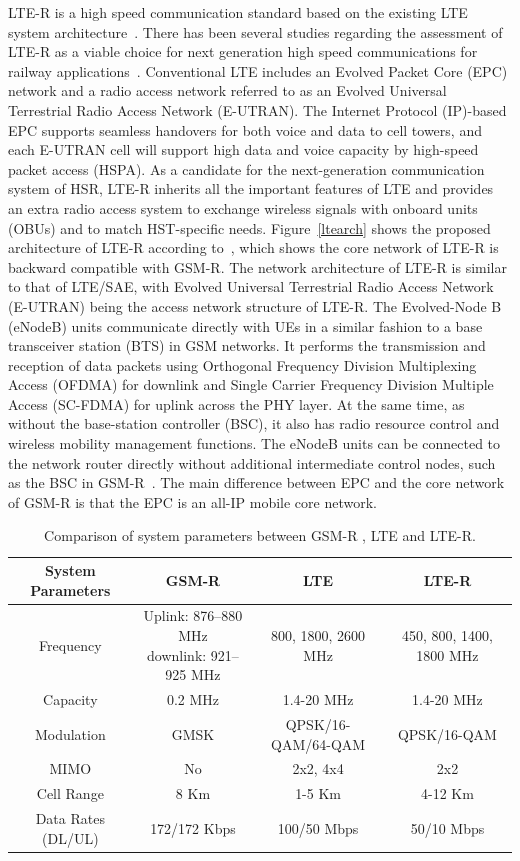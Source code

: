 LTE-R is a high speed communication standard based on the existing LTE system architecture~\cite{inplter4}. There has been several studies regarding the assessment of LTE-R as a viable choice for next generation high speed communications for railway applications~\cite{inplter5,inplter6}. Conventional LTE includes an Evolved Packet Core (EPC) network and a radio access network referred to as an Evolved Universal  Terrestrial  Radio  Access  Network (E-UTRAN). The  Internet  Protocol (IP)-based  EPC  supports  seamless handovers for both voice and data to cell towers, and each E-UTRAN cell will support high data and voice capacity by high-speed  packet  access  (HSPA).  As  a  candidate for the next-generation  communication  system  of  HSR,  LTE-R  inherits all the important features of LTE and provides an extra radio access system to exchange wireless signals with onboard  units (OBUs)  and to match HST-specific  needs. Figure~\ref{ltearch} shows the proposed architecture of LTE-R according to~\cite{trlter2}, which shows the core network of LTE-R is backward compatible with GSM-R. The network architecture of LTE-R is similar to that of LTE/SAE, with  Evolved Universal Terrestrial Radio Access Network (E-UTRAN) being the access network structure of LTE-R. The Evolved-Node B (eNodeB) units communicate directly with UEs in a similar fashion to a base transceiver station (BTS) in GSM networks. It performs the transmission and reception of data packets using Orthogonal Frequency Division Multiplexing Access (OFDMA) for downlink and Single Carrier Frequency Division Multiple Access (SC-FDMA) for uplink across the PHY layer. At the same time, as without the base-station controller (BSC), it also has radio  resource  control and wireless  mobility  management functions.  The eNodeB units can be connected to the network router directly without additional intermediate control nodes, such as the BSC in GSM-R~\cite{tingting2010high}. The main difference between EPC and the core network of GSM-R is that the EPC is an all-IP mobile core network.

\begin{table}[h!]
\caption{Comparison of system parameters between GSM-R , LTE and LTE-R.}
\begin{adjustbox}{width=\textwidth, center=\textwidth}
\begin{tabular}{| c | c | c | c |}
\toprule
System Parameters & GSM-R & LTE & LTE-R\\ 
\midrule
Frequency & \shortstack{Uplink: 876--880 MHz\\downlink: 921--925 MHz} & 800, 1800, 2600 MHz & 450, 800, 1400, 1800 MHz \\  
Capacity  & 0.2 MHz & 1.4-20 MHz & 1.4-20 MHz\\ 
Modulation  & GMSK & QPSK/16-QAM/64-QAM & QPSK/16-QAM\\ 
MIMO  & No  & 2x2, 4x4  & 2x2\\ 
Cell Range  & 8 Km  & 1-5 Km & 4-12 Km \\ 
Data Rates (DL/UL)  & 172/172 Kbps  & 100/50 Mbps & 50/10 Mbps\\ 
\bottomrule
\end{tabular}
\end{adjustbox}
\label{ltertable}
\end{table}


